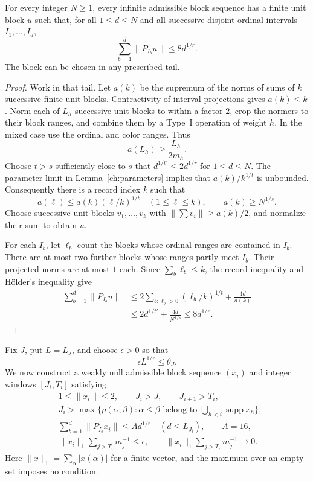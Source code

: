 \begin{lemma}\label{pair:partition}
For every integer $N\ge1$, every infinite admissible block sequence has a
finite unit block $u$ such that, for all $1\le d\le N$ and all successive
disjoint ordinal intervals $I_1,\ldots,I_d$,
\[
 \sum_{b=1}^d\|P_{I_b}u\|\le8d^{1/r}.
\]
The block can be chosen in any prescribed tail.
\end{lemma}

\begin{proof}
Work in that tail.  Let $a(k)$ be the supremum of the norms of sums of $k$
successive finite unit blocks.  Contractivity of interval projections gives
$a(k)\le k$.  Norm each of $L_h$ successive unit blocks to within a factor
$2$, crop the normers to their block ranges, and combine them by a Type~I
operation of weight $h$.  In the mixed case use the ordinal and color
ranges.  Thus
\[
 a(L_h)\ge\frac{L_h}{2m_h}.
\]
Choose $t>s$ sufficiently close to $s$ that
$d^{1/t'}\le2d^{1/r}$ for $1\le d\le N$.  The parameter limit in
Lemma~\ref{ch:parameters} implies that $a(k)/k^{1/t}$ is unbounded.
Consequently there is a record index $k$ such that
\[
 a(\ell)\le a(k)(\ell/k)^{1/t}\quad(1\le\ell\le k),
 \qquad a(k)\ge N^{1/s}.
\]
Choose successive unit blocks $v_1,\ldots,v_k$ with
$\|\sum v_i\|\ge a(k)/2$, and normalize their sum to obtain $u$.

For each $I_b$, let $\ell_b$ count the blocks whose ordinal ranges are
contained in $I_b$.  There are at most two further blocks whose ranges
partly meet $I_b$.  Their projected norms are at most $1$ each.  Since
$\sum_b\ell_b\le k$, the record inequality and H\"older's inequality give
\begin{align*}
 \sum_{b=1}^d\|P_{I_b}u\|
 &\le2\sum_{b:\ell_b>0}(\ell_b/k)^{1/t}+\frac{4d}{a(k)}\\
 &\le2d^{1/t'}+\frac{4d}{N^{1/s}}
 \le8d^{1/r}.
\end{align*}
\end{proof}

Fix $J$, put $L=L_J$, and choose $\epsilon>0$ so that
\begin{equation}\label{pair:epsilon}
 \epsilon L^{1/r}\le\theta_J.
\end{equation}
We now construct a weakly null admissible block sequence $(x_i)$ and
integer windows $[J_i,T_i]$ satisfying
\begin{align}
 &1\le\|x_i\|\le2,\qquad J_i>J,
 \qquad J_{i+1}>T_i, \label{pair:window-order}\\
 &J_i>\max\{\rho(\alpha,\beta):
       \alpha\le\beta\text{ belong to }\bigcup_{h<i}\operatorname{supp}x_h\},
       \label{pair:window-coherence}\\
 &\sum_{b=1}^d\|P_{I_b}x_i\|\le A d^{1/r}
       \quad(d\le L_{J_i}),\qquad A=16, \label{pair:window-partition}\\
 &\|x_i\|_1\sum_{j>T_i}m_j^{-1}\le\epsilon,
 \qquad \|x_i\|_1\sum_{j>T_i}m_j^{-1}\longrightarrow0.
       \label{pair:window-tail}
\end{align}
Here $\|x\|_1=\sum_\alpha|x(\alpha)|$ for a finite vector, and the maximum
over an empty set imposes no condition.

